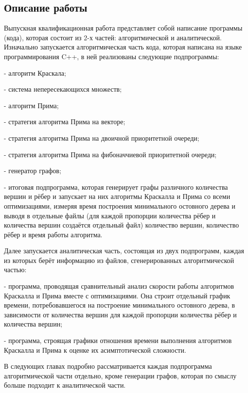 	\newpage
	
	\subsection{Описание работы}
	
	\hspace{0.5 cm} Выпускная квалификационная работа представляет собой написание программы (кода), которая состоит из 2-х частей: алгоритмической и аналитической. Изначально запускается алгоритмическая часть кода, которая написана на языке программирования C++, в ней реализованы следующие подпрограммы:
	
	- алгоритм Краскала;
	
	- система непересекающихся множеств;
	
	- алгоритм Прима;
	
	- стратегия алгоритма Прима на векторе;
	
	- стратегия алгоритма Прима на двоичной приоритетной очереди;
	
	- стратегия алгоритма Прима на фибоначчиевой приоритетной очереди;
	
	- генератор графов;
	
	- итоговая подпрограмма, которая генерирует графы различного количества вершин и рёбер и запускает на них алгоритмы Краскалла и Прима со всеми оптимизациями, измеряя время построения минимального остовного дерева и выводя в отдельные файлы (для каждой пропорции количества рёбер и количества вершин создаётся отдельный файл) количество вершин, количество рёбер и время работы алгоритма.
	
	Далее запускается аналитическая часть, состоящая из двух подпрограмм, каждая из которых берёт информацию из файлов, сгенерированных алгоритмической частью:
	
	- программа, проводящая сравнительный анализ скорости работы алгоритмов Краскалла и Прима вместе с оптимизациями. Она строит отдельный график времени, потребовавшегося на построение минимального остовного дерева, в зависимости от количества вершин для каждой пропорции количества рёбер и количества вершин;
	
	- программа, строящая графики отношения времени выполнения алгоритмов Краскалла и Прима к оценке их асимптотической сложности.
	
	В следующих главах подробно рассматривается каждая подпрограмма алгоритмической части отдельно, кроме генерации графов, которая по смыслу больше подходит к аналитической части.
	
